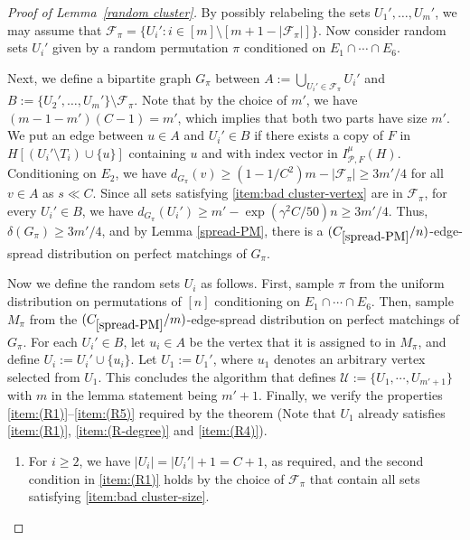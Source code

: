 \documentclass[11pt, letterpaper]{amsart}
\theoremstyle{plain}
\numberwithin{equation}{section}
\theoremstyle{definition}
\begin{document}
\begin{proof}[Proof of Lemma~\ref{random cluster}]
By possibly relabeling the sets $U_1',\dots,U_m'$, we may assume that $\mathcal{F}_{\pi}=\{U_i':i\in [m]\setminus [m+1-|\mathcal{F}_{\pi}|]\}$. 
Now consider random sets $U_i'$ given by a random permutation $\pi$ conditioned on $E_1\cap \cdots\cap E_6$.

Next, we define a bipartite graph $G_{\pi}$ between $A:=\bigcup_{U_i'\in \mathcal{F}_{\pi}} U_i'$ and $B:=\{U_2',\dots,U_m'\}\setminus \mathcal{F}_{\pi}$. 
Note that by the choice of $m'$, we have $(m-1-m')(C-1)=m'$, which implies that both two parts have size $m'$. 
We put an edge between $u\in A$ and $U_i'\in B$ if there exists a copy of $F$ in $H[(U_i'\setminus T_i)\cup\{u\}]$ containing $u$ and with index vector in $ I_{\mathcal{P},F}^{\mu}(H)$. 
Conditioning on $E_2$, we have $d_{G_{\pi}}(v)\ge (1-1/C^2)m-|\mathcal{F}_{\pi}|\ge 3m'/4$ for all $v\in A$ as $s\ll C$. 
Since all sets satisfying \ref{item:bad cluster-vertex} are in $\mathcal{F}_{\pi}$, for every $U_i'\in B$, we have $d_{G_{\pi}}(U_i')\ge m'-\exp{(\gamma^2C/50)}n\ge 3m'/4 $. 
Thus, $\delta(G_{\pi})\ge 3m'/4$, and by Lemma \ref{spread-PM}, there is a $(C_{\ref{spread-PM}}/n)$-edge-spread distribution on perfect matchings of $G_{\pi}$.

Now we define the random sets $U_i$ as follows. First, sample $\pi$ from the uniform distribution on permutations of $[n]$ conditioning on $E_1\cap \cdots\cap E_6$. Then, sample $M_{\pi}$ from the $(C_{\ref{spread-PM}}/m)$-edge-spread distribution on perfect matchings of $G_{\pi}$. For each $U_i'\in B$, let $u_i\in A$ be the vertex that it is assigned to in $M_{\pi}$, and define $U_i:=U_i'\cup \{u_i\}$. Let $U_1:=U_1'$, where \(u_1\) denotes an arbitrary vertex selected from \(U_1\). %
This concludes the algorithm that defines $\mathcal{U}:=\{U_1,\cdots, U_{m'+1}\}$ with $m$ in the lemma statement being $m'+1$. 
Finally, we verify the properties \ref{item:(R1)}--\ref{item:(R5)} required by the theorem (Note that $U_1$ already satisfies \ref{item:(R1)}, \ref{item:(R-degree)} and \ref{item:(R4)}).

\begin{enumerate}[label=(\arabic*)]
\item For $i\ge 2$, we have $|U_i|=|U_i'|+1=C+1$, as required, and the second condition in \ref{item:(R1)} holds by the choice of $\mathcal{F}_{\pi}$ that contain all sets satisfying \ref{item:bad cluster-size}.
            

\end{enumerate}
\end{proof}
\end{document}
